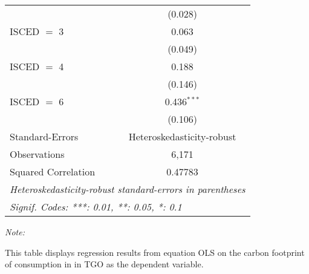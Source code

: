\begin{table}[htbp!]
\begin{adjustbox}{width = 1\textwidth, max height = 0.95\textheight, center}
\begin{threeparttable}[b]
\begin{tabular}{lc}
                                & (0.028)\\   
            ISCED $=$ 3         & 0.063\\   
                                & (0.049)\\   
            ISCED $=$ 4         & 0.188\\   
                                & (0.146)\\   
            ISCED $=$ 6         & 0.436$^{***}$\\   
                                & (0.106)\\   
            \midrule 
            Standard-Errors     & Heteroskedasticity-robust \\   
            Observations        & 6,171\\  
            Squared Correlation & 0.47783\\  
            \midrule \midrule
            \multicolumn{2}{l}{\emph{Heteroskedasticity-robust standard-errors in parentheses}}\\
            \multicolumn{2}{l}{\emph{Signif. Codes: ***: 0.01, **: 0.05, *: 0.1}}\\
         \end{tabular}
         
         \begin{tablenotes}\item \medskip \textit{Note:}
            \item This table displays regression results from equation OLS on the carbon footprint of consumption in  in TGO as the dependent variable.  
         \end{tablenotes}
      \end{threeparttable}
   \end{adjustbox}
\end{table}


